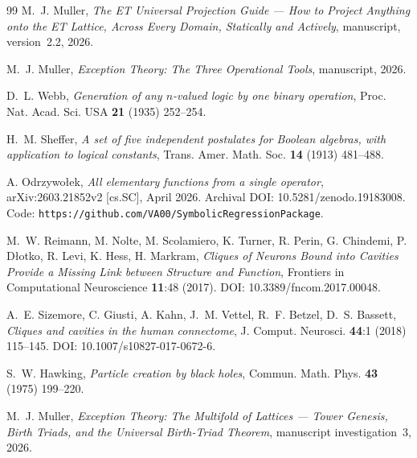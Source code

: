 \documentclass[11pt,a4paper]{article}
\theoremstyle{definition}
\theoremstyle{remark}
\begin{document}
\begin{thebibliography}{99}
M.~J. Muller,
\emph{The ET Universal Projection Guide --- How to Project Anything onto the ET Lattice, Across Every Domain, Statically and Actively}, manuscript, version~2.2, 2026.

M.~J. Muller,
\emph{Exception Theory: The Three Operational Tools}, manuscript, 2026.

D.~L. Webb,
\emph{Generation of any $n$-valued logic by one binary operation},
Proc. Nat. Acad. Sci. USA {\bf 21} (1935) 252--254.

H.~M. Sheffer,
\emph{A set of five independent postulates for Boolean algebras, with application to logical constants},
Trans. Amer. Math. Soc. {\bf 14} (1913) 481--488.

A. Odrzywo{\l}ek,
\emph{All elementary functions from a single operator},
arXiv:2603.21852v2 [cs.SC], April 2026.
Archival DOI: 10.5281/zenodo.19183008.
Code: \texttt{https://github.com/VA00/SymbolicRegressionPackage}.

M.~W. Reimann, M. Nolte, M. Scolamiero, K. Turner, R. Perin, G. Chindemi, P. D{\l}otko, R. Levi, K. Hess, H. Markram,
\emph{Cliques of Neurons Bound into Cavities Provide a Missing Link between Structure and Function},
Frontiers in Computational Neuroscience {\bf 11}:48 (2017).
DOI: 10.3389/fncom.2017.00048.

A.~E. Sizemore, C. Giusti, A. Kahn, J.~M. Vettel, R.~F. Betzel, D.~S. Bassett,
\emph{Cliques and cavities in the human connectome},
J. Comput. Neurosci. {\bf 44}:1 (2018) 115--145.
DOI: 10.1007/s10827-017-0672-6.

S.~W. Hawking,
\emph{Particle creation by black holes},
Commun. Math. Phys. {\bf 43} (1975) 199--220.

M.~J. Muller,
\emph{Exception Theory: The Multifold of Lattices --- Tower Genesis, Birth Triads, and the Universal Birth-Triad Theorem}, manuscript investigation~3, 2026.

\end{thebibliography}
\end{document}
